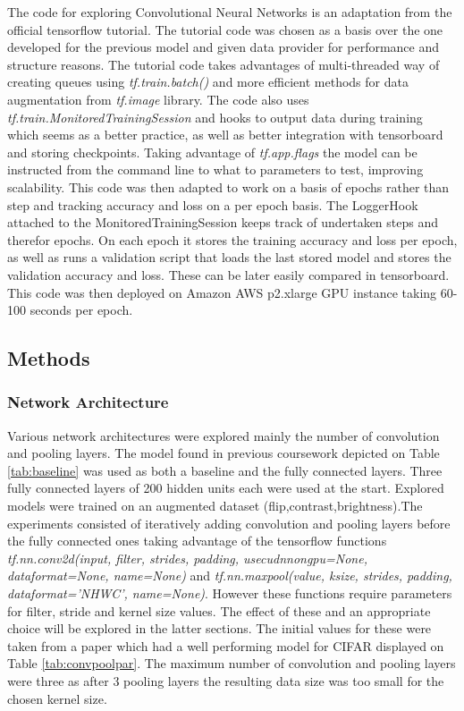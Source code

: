 \documentclass[12pt]{article}
\begin{document}
The code for exploring Convolutional Neural Networks is an adaptation from the official tensorflow tutorial\cite{tf}. The tutorial code was chosen as a basis over the one developed for the previous model and given data provider for performance and structure reasons. The tutorial code takes advantages of multi-threaded way of creating queues using \textit{tf.train.batch()} and more efficient methods for data augmentation from \textit{tf.image} library. The code also uses \textit{tf.train.MonitoredTrainingSession} and hooks to output data during training which seems as a better practice, as well as better integration with tensorboard and storing checkpoints. Taking advantage of \textit{tf.app.flags} the model can be instructed from the command line to what to parameters to test, improving scalability.  This code was then adapted to work on a basis of epochs rather than step and tracking accuracy and loss on a per epoch basis. The LoggerHook attached to the MonitoredTrainingSession keeps track of undertaken steps and therefor epochs. On each epoch it stores the training accuracy and loss per epoch, as well as runs a validation script that loads the last stored model and stores the validation accuracy and loss. These can be later easily compared in tensorboard. This code was then deployed on Amazon AWS p2.xlarge GPU instance taking 60-100 seconds per epoch.



\subsection*{Methods}

\subsubsection*{Network Architecture}

Various network architectures were explored mainly the number of convolution and pooling layers. The model found in previous coursework depicted on Table \ref{tab:baseline} was used as both a baseline and the fully connected layers. Three fully connected layers of 200 hidden units each were used at the start. Explored models were trained on an augmented dataset (flip,contrast,brightness).The experiments consisted of iteratively adding convolution and pooling layers before the fully connected ones taking advantage of the tensorflow functions \textit{tf.nn.conv2d(input, filter, strides, padding, usecudnnongpu=None, dataformat=None, name=None)} and \textit{tf.nn.maxpool(value, ksize, strides, padding, dataformat='NHWC', name=None)}. However these functions require parameters for filter, stride and kernel size values. The effect of these and an appropriate choice will be explored in the latter sections. The initial values for these were taken from a paper which had a well performing model for CIFAR \cite{inspiration} displayed on Table \ref{tab:convpoolpar}. The maximum number of convolution and pooling layers were three as after 3 pooling layers the resulting data size was too small for the chosen kernel size. 
\end{document}
